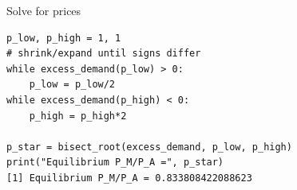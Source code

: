 \documentclass[notes,11pt, aspectratio=169, xcolor=table]{beamer}
\begin{document}
\begin{frame}[fragile=singleslide]{Solve for prices}
    \begin{verbatim}
p_low, p_high = 1, 1
# shrink/expand until signs differ
while excess_demand(p_low) > 0:
    p_low = p_low/2
while excess_demand(p_high) < 0:
    p_high = p_high*2

p_star = bisect_root(excess_demand, p_low, p_high)  
print("Equilibrium P_M/P_A =", p_star)
[1] Equilibrium P_M/P_A = 0.833808422088623
    \end{verbatim}
\end{frame}
\end{document}
